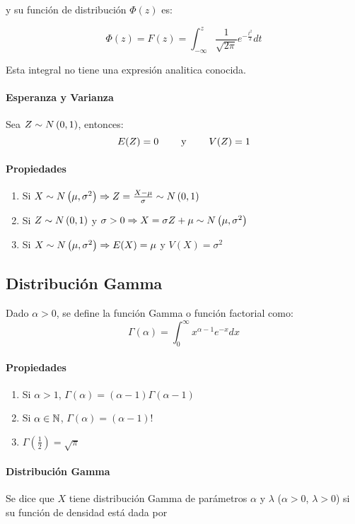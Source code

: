 y su función de distribución $\Phi(z)$ es:

$$\Phi(z) = F(z) =\int_{-\infty}^{z}\frac{1}{\sqrt{2\pi}}e^{-\frac{t^2}{2}}dt$$

Esta integral no tiene una expresión analitica conocida.

\paragraph{Esperanza y Varianza}
Sea $Z\sim N\left(0,1\right)$, entonces:
$$E(Z) = 0  \hspace*{8mm}\text{y}\hspace*{8mm} V(Z) = 1$$
\paragraph{Propiedades}
\begin{enumerate}
\item Si $X\sim N\left(\mu,\sigma^2\right)\Rightarrow Z = \frac{X-\mu}{\sigma}\sim N\left(0,1\right)$
\item Si $Z\sim N\left(0,1\right)$ y $\sigma > 0\Rightarrow X = \sigma Z+\mu\sim N\left(\mu,\sigma^2\right)$
\item Si $X\sim N\left(\mu,\sigma^2\right)\Rightarrow E(X) = \mu$ y $V(X)=\sigma^2$
\end{enumerate}
\subsection{Distribución Gamma}
Dado $\alpha > 0$, se define la función Gamma o función factorial como:
$$\Gamma(\alpha) = \int_{0}^{\infty} x^{\alpha-1}e^{-x}dx$$

\paragraph{Propiedades}
\begin{enumerate}
\item Si $\alpha > 1$, $\Gamma(\alpha) = (\alpha-1)\Gamma(\alpha-1)$
\item Si $\alpha\in\mathbb{N}$, $\Gamma(\alpha) = (\alpha-1)!$
\item $\Gamma(\frac{1}{2}) = \sqrt{\pi}$
\end{enumerate}

\paragraph{Distribución Gamma} Se dice que $X$ tiene distribución Gamma de parámetros $\alpha$ y $\lambda$ ($\alpha>0$, $\lambda>0$) si su función de densidad está dada por

